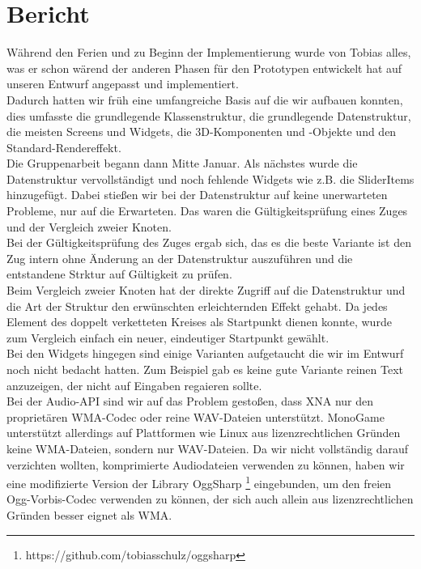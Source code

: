 \chapter{Bericht}
Während den Ferien und zu Beginn der Implementierung wurde von Tobias alles, was er schon wärend der anderen Phasen für den Prototypen entwickelt hat auf unseren Entwurf angepasst und implementiert.
\\
Dadurch hatten wir früh eine umfangreiche Basis auf die wir aufbauen konnten, dies umfasste die grundlegende Klassenstruktur, die grundlegende Datenstruktur, die meisten Screens und Widgets, die 3D-Komponenten und -Objekte und den Standard-Rendereffekt.
\\
Die Gruppenarbeit begann dann Mitte Januar.
Als nächstes wurde die Datenstruktur vervollständigt und noch fehlende Widgets wie z.B. die SliderItems hinzugefügt.
Dabei stießen wir bei der Datenstruktur auf keine unerwarteten Probleme, nur auf die Erwarteten.
Das waren die Gültigkeitsprüfung eines Zuges und der Vergleich zweier Knoten.
\\
Bei der Gültigkeitsprüfung des Zuges ergab sich, das es die beste Variante ist den Zug intern ohne Änderung an der Datenstruktur auszuführen und die entstandene Strktur auf Gültigkeit zu prüfen.
\\
Beim Vergleich zweier Knoten hat der direkte Zugriff auf die Datenstruktur und die Art der Struktur den erwünschten erleichternden Effekt gehabt. Da jedes Element des doppelt verketteten Kreises als Startpunkt dienen konnte, wurde zum Vergleich einfach ein neuer, eindeutiger Startpunkt gewählt.
\\
Bei den Widgets hingegen sind einige Varianten aufgetaucht die wir im Entwurf noch nicht bedacht hatten. Zum Beispiel gab es keine gute Variante reinen Text anzuzeigen, der nicht auf Eingaben regaieren sollte.
\\
Bei der Audio-API sind wir auf das Problem gestoßen, dass XNA nur den proprietären WMA-Codec oder reine WAV-Dateien unterstützt. MonoGame unterstützt allerdings auf Plattformen wie Linux aus lizenzrechtlichen Gründen keine WMA-Dateien, sondern nur WAV-Dateien. Da wir nicht vollständig darauf verzichten wollten, komprimierte Audiodateien verwenden zu können, haben wir eine modifizierte Version der Library OggSharp \footnote{https://github.com/tobiasschulz/oggsharp} eingebunden, um den freien Ogg-Vorbis-Codec verwenden zu können, der sich auch allein aus lizenzrechtlichen Gründen besser eignet als WMA.

